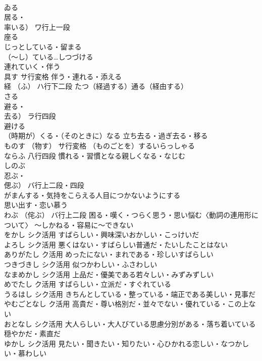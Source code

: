 \documentclass[8pt]{extreport}
\begin{document}
\begin{CJK}{UTF8}{min}
\\	ゐる	
\\	居る・
\\	率いる）	ワ行上一段	
\\	座る
\\	じっとしている・留まる
\\	（～し）ている…しつづける
\\	連れていく・伴う
\\	具す		サ行変格	伴う・連れる・添える
\\	経	（ふ）	ハ行下二段	たつ（経過する）通る（経由する）
\\	さる	
\\	避る・
\\	去る）	ラ行四段	
\\	避ける
\\	（時期が）くる・（そのときに）なる 立ち去る・過ぎ去る・移る
\\	ものす	（物す）	サ行変格	（ものごとを）するいらっしゃる
\\	ならふ		八行四段	慣れる・習慣となる親しくなる・なじむ
\\	しのぶ	
\\	忍ぶ・
\\	偲ぶ）	バ行上二段・四段	
\\	がまんする・気持をこらえる人目につかないようにする
\\	思い出す・恋い慕う
\\	わぶ	（侘ぶ）	バ行上二段	困る・嘆く・つらく思う・思い悩む〈動詞の連用形について〉 ～しかねる・容易に～できない
\\	をかし		シク活用	すばらしい・興味深いおかしい・こっけいだ
\\	よろし		シク活用	悪くはない・すばらしい普通だ・たいしたことはない
\\	ありがたし		ク活用	めったにない・まれである・珍しいすばらしい
\\	つきづきし		シク活用	似つかわしい・ふさわしい
\\	なまめかし		シク活用	上品だ・優美である若々しい・みずみずしい
\\	めでたし		ク活用	すばらしい・立派だ・すぐれている
\\	うるはし		シク活用	きちんとしている・整っている・端正である美しい・見事だ
\\	やむごとなし		ク活用	高貴だ・尊い格別だ・並々でない・優れている・この上ない
\\	おとなし		シク活用	大人らしい・大人びている思慮分別がある・落ち着いている穏やかだ・素直だ
\\	ゆかし		シク活用	見たい・聞きたい・知りたい・心ひかれる恋しい・なつかしい・慕わしい

\end{CJK}
\end{document}
